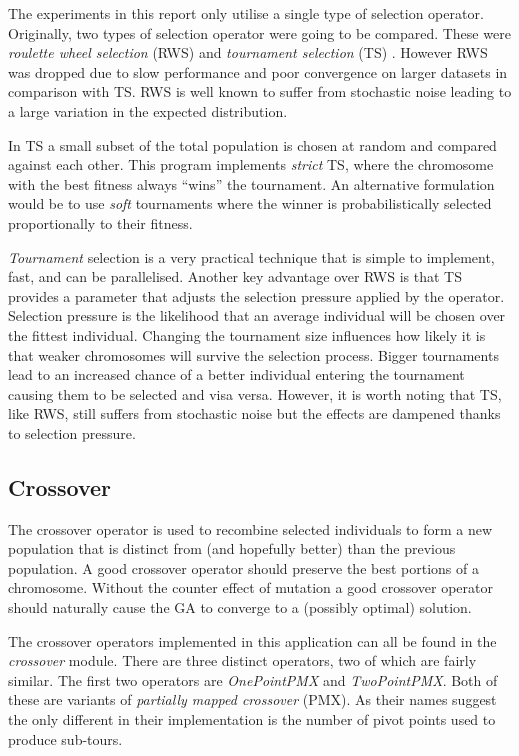 \documentclass[journal]{IEEEtran}
\begin{document}
The experiments in this report only utilise a single type of selection operator. Originally, two types of selection operator were going to be compared. These were \textit{roulette wheel selection} (RWS) and \textit{tournament selection} (TS) \cite{colin2002genetic}. However RWS was dropped due to slow performance and poor convergence on larger datasets in comparison with TS. RWS is well known to suffer from stochastic noise leading to a large variation in the expected distribution.

In TS a small subset of the total population is chosen at random and compared against each other. This program implements \textit{strict} TS,  where the chromosome with the best fitness always ``wins'' the tournament. An alternative formulation would be to use \textit{soft} tournaments where the winner is probabilistically selected proportionally to their fitness.

\textit{Tournament} selection is a very practical technique that is simple to implement, fast, and can be parallelised. Another key advantage over RWS is that TS provides a parameter that adjusts the selection pressure applied by the  operator. Selection pressure is the likelihood that an average individual will be chosen over the fittest individual. Changing the tournament size influences how likely it is that weaker chromosomes will survive the selection process. Bigger tournaments lead to an increased chance of a better individual entering the tournament causing them to be selected and visa versa. However, it is worth noting that TS, like RWS, still suffers from stochastic noise but the effects are dampened thanks to selection pressure.

\subsection{Crossover}
The crossover operator is used to recombine selected individuals to form a new population that is distinct from (and hopefully better) than the previous population. A good crossover operator should preserve the best portions of a chromosome. Without the counter effect of mutation a good crossover operator should naturally cause the GA to converge to a (possibly optimal) solution.

The crossover operators implemented in this application can all be found in the \textit{crossover} module. There are three distinct operators, two of which are fairly similar. The first two operators are \textit{OnePointPMX} and \textit{TwoPointPMX}. Both of these are variants of \textit{partially mapped crossover} (PMX). As their names suggest the only different in their implementation is the number of pivot points used to produce sub-tours.
\end{document}

